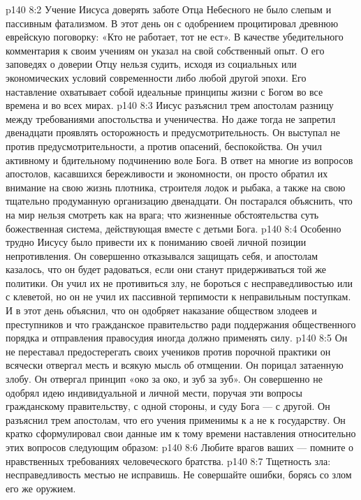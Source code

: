 \vs p140 8:2 \bibnobreakspace {} Учение Иисуса доверять заботе Отца Небесного не было слепым и пассивным фатализмом. В этот день он с одобрением процитировал древнюю еврейскую поговорку: «Кто не работает, тот не ест». В качестве убедительного комментария к своим учениям он указал на свой собственный опыт. О его заповедях о доверии Отцу нельзя судить, исходя из социальных или экономических условий современности либо любой другой эпохи. Его наставление охватывает собой идеальные принципы жизни с Богом во все времена и во всех мирах.
\vs p140 8:3 Иисус разъяснил трем апостолам разницу между требованиями апостольства и ученичества. Но даже тогда не запретил двенадцати проявлять осторожность и предусмотрительность. Он выступал не против предусмотрительности, а против опасений, беспокойства. Он учил активному и бдительному подчинению воле Бога. В ответ на многие из вопросов апостолов, касавшихся бережливости и экономности, он просто обратил их внимание на свою жизнь плотника, строителя лодок и рыбака, а также на свою тщательно продуманную организацию двенадцати. Он постарался объяснить, что на мир нельзя смотреть как на врага; что жизненные обстоятельства суть божественная система, действующая вместе с детьми Бога.
\vs p140 8:4 Особенно трудно Иисусу было привести их к пониманию своей личной позиции непротивления. Он совершенно отказывался защищать себя, и апостолам казалось, что он будет радоваться, если они станут придерживаться той же политики. Он учил их не противиться злу, не бороться с несправедливостью или с клеветой, но он не учил их пассивной терпимости к неправильным поступкам. И в этот день объяснил, что он одобряет наказание обществом злодеев и преступников и что гражданское правительство ради поддержания общественного порядка и отправления правосудия иногда должно применять силу.
\vs p140 8:5 Он не переставал предостерегать своих учеников против порочной практики  он всячески отвергал месть и всякую мысль об отмщении. Он порицал затаенную злобу. Он отвергал принцип «око за око, и зуб за зуб». Он совершенно не одобрял идею индивидуальной и личной мести, поручая эти вопросы гражданскому правительству, с одной стороны, и суду Бога --- с другой. Он разъяснил трем апостолам, что его учения применимы к  а не к государству. Он кратко сформулировал свои данные им к тому времени наставления относительно этих вопросов следующим образом:
\vs p140 8:6 Любите врагов ваших --- помните о нравственных требованиях человеческого братства.
\vs p140 8:7 Тщетность зла: несправедливость местью не исправишь. Не совершайте ошибки, борясь со злом его же оружием.
